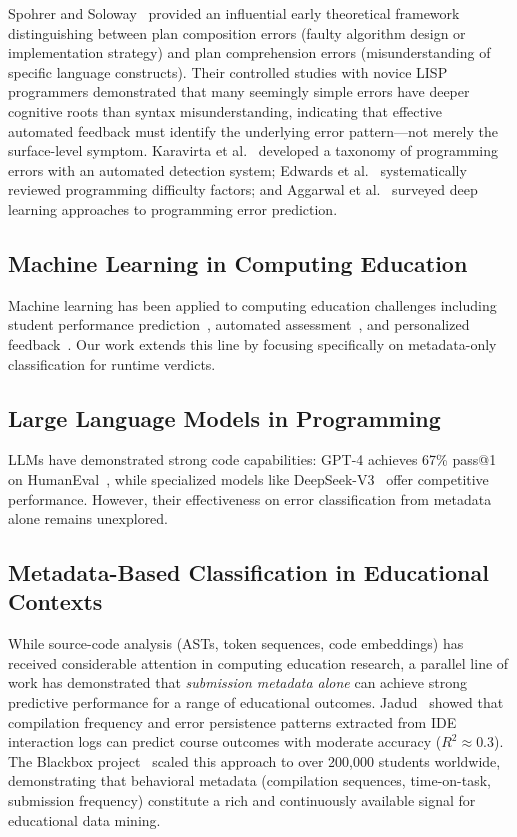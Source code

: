 \documentclass[acmsmall]{acmart}
\begin{document}
Spohrer and Soloway~\cite{spohrer1986novice} provided an influential early
theoretical framework distinguishing between plan composition errors (faulty
algorithm design or implementation strategy) and plan comprehension errors
(misunderstanding of specific language constructs). Their controlled studies
with novice LISP programmers demonstrated that many seemingly simple errors
have deeper cognitive roots than syntax misunderstanding, indicating that
effective automated feedback must identify the underlying error pattern---not
merely the surface-level symptom. Karavirta et al.~\cite{karavirta2019mistake} developed a
taxonomy of programming errors with an automated detection system; Edwards et
al.~\cite{edwards2023programming} systematically reviewed programming difficulty factors;
and Aggarwal et al.~\cite{aggarwal2024programming} surveyed deep learning approaches
to programming error prediction.

\subsection{Machine Learning in Computing Education}

Machine learning has been applied to computing education challenges including student performance prediction~\cite{romero2013data}, automated assessment~\cite{pears2007survey}, and personalized feedback~\cite{barbosa2023feedback}. Our work extends this line by focusing specifically on metadata-only classification for runtime verdicts.

\subsection{Large Language Models in Programming}

LLMs have demonstrated strong code capabilities: GPT-4 achieves 67\% pass@1 on HumanEval~\cite{openai2023gpt4}, while specialized models like DeepSeek-V3~\cite{deepseek2024deepseekv3} offer competitive performance. However, their effectiveness on error classification from metadata alone remains unexplored.

\subsection{Metadata-Based Classification in Educational Contexts}

While source-code analysis (ASTs, token sequences, code embeddings) has
received considerable attention in computing education research, a parallel
line of work has demonstrated that \textit{submission metadata alone} can
achieve strong predictive performance for a range of educational outcomes.
Jadud~\cite{jadud2006methods} showed that compilation frequency and
error persistence patterns extracted from IDE interaction logs can predict
course outcomes with moderate accuracy ($R^2 \approx 0.3$). The Blackbox
project~\cite{brown2014blackbox} scaled this approach to over 200,000
students worldwide, demonstrating that behavioral metadata (compilation
sequences, time-on-task, submission frequency) constitute a rich and
continuously available signal for educational data mining.
\end{document}
